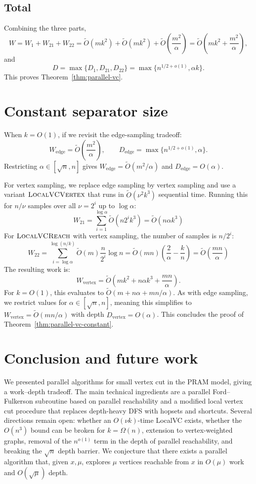\documentclass[11pt]{article}
\theoremstyle{remark}
\newcommand{\tildeO}{\widetilde{O}}
\newcommand{\LocalVCReach}{\textsc{LocalVCReach}}
\newcommand{\LocalVCVertex}{\textsc{LocalVCVertex}}
\begin{document}
\subsection{Total}
Combining the three parts,
\[
W = W_1+W_{21}+W_{22} = \tildeO(mk^2)+\tildeO(mk^2)+\tildeO\!\left(\frac{m^2}{\alpha}\right) = \tildeO\!\left(mk^2+\frac{m^2}{\alpha}\right),
\]
and
\[
D = \max\{D_1,D_{21},D_{22}\} = \max\{n^{1/2+o(1)},\alpha k\}.
\]
This proves Theorem~\ref{thm:parallel-vc}.

\section{Constant separator size}

When \(k=O(1)\), if we revisit the edge-sampling tradeoff:
\[
W_{\mathrm{edge}}=\tildeO\!\left(\frac{m^2}{\alpha}\right),\qquad D_{\mathrm{edge}}=\max\{n^{1/2+o(1)},\alpha\}.
\]
Restricting \(\alpha\in[\sqrt n,n]\) gives \(W_{\mathrm{edge}}=\tildeO(m^2/\alpha)\) and \(D_{\mathrm{edge}}=O(\alpha)\).

For vertex sampling, we replace edge sampling by vertex sampling and use a variant \(\LocalVCVertex\) that runs in \(\tildeO(\nu^2k^3)\) sequential time. Running this for \(n/\nu\) samples over all \(\nu = 2^i\) up to \(\log \alpha\):
\[
W_{21} = \sum_{i=1}^{\log \alpha} \tilde{O}(n 2^i k^3) = \tilde{O}(n \alpha k^3)
\]
For \(\LocalVCReach\) with vertex sampling, the number of samples is \(n/2^i\):
\[
W_{22} = \sum_{i=\log \alpha}^{\log (n/k)} \tilde{O} (m) \frac{n}{2^i} \log n = \tilde{O}(mn) \left( \frac{2}{\alpha} - \frac{k}{n} \right) = \tilde{O}\left(\frac{mn}{\alpha}\right)
\]
The resulting work is:
\[
W_{\mathrm{vertex}} = \tildeO\!\left(mk^2+n\alpha k^3+\frac{mn}{\alpha}\right).
\]
For \(k=O(1)\), this evaluates to \(\tildeO(m+n\alpha+mn/\alpha)\). As with edge sampling, we restrict values for \(\alpha \in \left[\sqrt{n}, n\right]\), meaning this simplifies to \(W_{\mathrm{vertex}}=\tildeO(mn/\alpha)\) with depth \(D_{\mathrm{vertex}}=O(\alpha)\). This concludes the proof of Theorem~\ref{thm:parallel-vc-constant}.

\section{Conclusion and future work}

We presented parallel algorithms for small vertex cut in the PRAM model, giving a work--depth tradeoff. The main technical ingredients are a parallel Ford--Fulkerson subroutine based on parallel reachability and a modified local vertex cut procedure that replaces depth-heavy DFS with hopsets and shortcuts. Several directions remain open: whether an \(O(\nu k)\)-time LocalVC exists, whether the \(O(n^3)\) bound can be broken for \(k=\Omega(n)\), extension to vertex-weighted graphs, removal of the \(n^{o(1)}\) term in the depth of parallel reachability, and breaking the \(\sqrt n\) depth barrier. We conjecture that there exists a parallel algorithm that, given \(x,\mu\), explores \(\mu\) vertices reachable from \(x\) in \(O(\mu)\) work and \(O(\sqrt\mu)\) depth.



\end{document}
